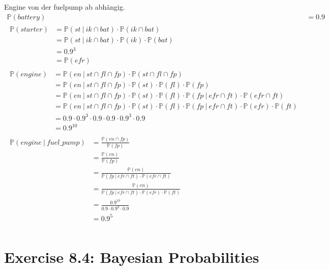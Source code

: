 \documentclass[a4paper]{scrartcl}
\newcommand{\prob}{\mathbb{P}}
\def \blattnr {8}
\begin{document}
Engine von der fuelpump ab abhängig.
\begin{align*}
    \prob(battery) &= \num{0,9} \\
    \begin{split}
        \prob(starter)
        &= \prob(st\ |\ ik \cap bat) \cdot \prob(ik \cap bat) \\
        &= \prob(st\ |\ ik \cap bat) \cdot \prob(ik) \cdot \prob(bat) \\
        &=\num{0,9}^3 \\
        &= \prob(efr)
    \end{split} \\
    \begin{split}
        \prob(engine)
        &= \prob(en\ |\ st \cap fl \cap fp) \cdot \prob(st \cap fl \cap fp) \\
        &= \prob(en\ |\ st \cap fl \cap fp) \cdot \prob(st) \cdot \prob(fl) \cdot \prob(fp) \\
        &= \prob(en\ |\ st \cap fl \cap fp) \cdot \prob(st) \cdot \prob(fl) \cdot \prob(fp\ |\ efr \cap ft) \cdot \prob(efr \cap ft) \\
        &= \prob(en\ |\ st \cap fl \cap fp) \cdot \prob(st) \cdot \prob(fl) \cdot \prob(fp\ |\ efr \cap ft) \cdot \prob(efr) \cdot \prob(ft) \\
        &= \num{0,9} \cdot \num{0,9}^3 \cdot \num{0,9} \cdot \num{0,9} \cdot \num{0,9}^3 \cdot \num{0,9} \\
        &= \num{0,9}^{10}
    \end{split} \\
    \begin{split}
        \prob(engine\ |\ fuel\_pump)
        &= \frac{\prob(en \cap fp)}{\prob(fp)} \\
        &= \frac{\prob(en)}{\prob(fp)} \\
        &= \frac{\prob(en)}{\prob(fp\ |\ efr \cap ft) \cdot \prob(efr \cap ft)} \\
        &= \frac{\prob(en)}{\prob(fp\ |\ efr \cap ft) \cdot \prob(efr) \cdot \prob(ft)} \\
        &= \frac{\num{0,9}^10}{\num{0,9} \cdot \num{0,9}^3 \cdot \num{0,9}} \\
        &= \num{0,9}^5 \\
    \end{split}
\end{align*}


\section*{Exercise \blattnr.4: Bayesian Probabilities}
\end{document}
